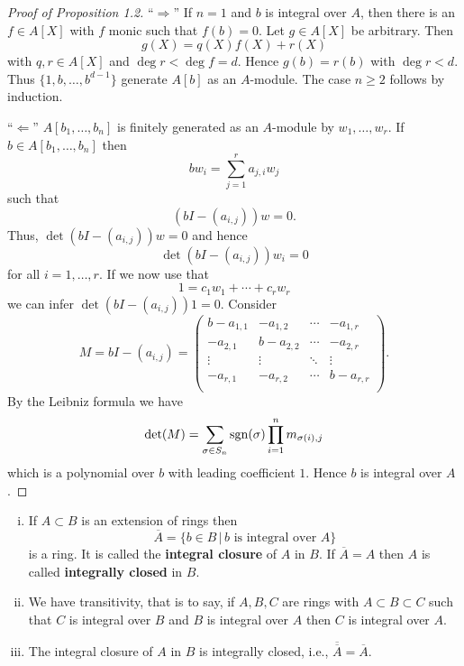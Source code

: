 \begin{proof}[Proof of Proposition 1.2]
\enquote{$\Rightarrow$} If $n=1$ and $b$ is integral over $A$, then there is an $f \in A[X]$ with $f$ monic such that $f(b)=0$. Let $g \in A[X]$ be arbitrary. Then 
\[ g(X) = q(X)f(X)+r(X)
\]
with $q,r \in A[X]$ and $\deg r < \deg f = d$. Hence $g(b)=r(b)$ with $\deg r < d$. Thus $\{1,b, \dots, b^{d-1} \}$ generate $A[b]$ as an $A$-module.
The case $n\geq 2$ follows by induction.

\bigskip \enquote{$\Leftarrow$}
$A[b_1,\dots,b_n]$ is finitely generated as an $A$-module by $w_1, \dots, w_r$.
If $b \in A[b_1,\dots,b_n]$ then
\[ bw_i = \sum_{j=1}^{r} a_{j,i}w_j
\]
such that
\[ \left( bI - (a_{i,j}) \right)w = 0.
\]
Thus, $\det \left( bI - (a_{i,j}) \right)w = 0$ and hence 
\[\det \left( bI - (a_{i,j}) \right)w_i = 0
\]
for all $i=1,\dots, r$. If we now use that 
\[ 1 = c_1w_1+ \cdots + c_rw_r
\]
we can infer $\det \left( bI - (a_{i,j}) \right)1 = 0$. Consider
\[M= bI - (a_{i,j}) = \begin{pmatrix}
b-a_{1,1} & -a_{1,2} & \cdots & -a_{1,r} \\
-a_{2,1} & b-a_{2,2} & \cdots & -a_{2,r} \\
\vdots & \vdots & \ddots & \vdots \\
-a_{r,1} & -a_{r,2} & \cdots & b-a_{r,r} \\
\end{pmatrix}.
\]
By the Leibniz formula we have
\[ \det(M)= \sum_{\sigma\in S_n} \operatorname{sgn}(\sigma ) \prod_{i=1}^n m_{\sigma(i),j}
\]
which is a polynomial over $b$ with leading coefficient $1$. Hence $b$ is integral over $A$.
\end{proof}


\begin{Kor}
\begin{enumerate}[(i)]
	\item If $A \subset B$ is an extension of rings then
	\[ \overline{A} = \{ b \in B \, | \, b \text{ is integral over } A
	\}
	\]
	is a ring. It is called the \textbf{integral closure } of $A$ in $B$.
	If $\overline{A} = A$ then $A$ is called \textbf{integrally closed}  in $B$.
	\item We have transitivity, that is to say, if $A,B,C$ are rings with $A \subset B \subset C$ such that $C$ is integral over $B$ and $B$ is integral over $A$ then $C$ is integral over $A$.
	\item The integral closure of $A$ in $B$ is integrally closed, i.e., 
	$\overline{\overline{A}} = \overline{A}$.
\end{enumerate}
\end{Kor}


